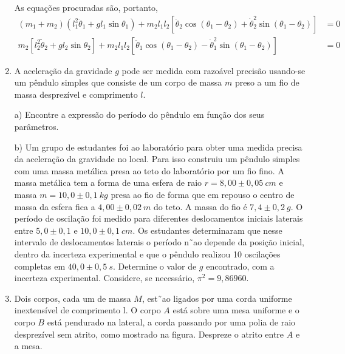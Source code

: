 \begin{enumerate}[start=1,label={\bfseries Q\arabic*.}]
$$$$
As equações procuradas são, portanto,
$$
\begin{aligned}
\left(m_{1}+m_{2}\right)\left(l_{1}^{2} \ddot{\theta}_{1}+g l_{1} \sin \theta_{1}\right)+m_{2} l_{1} l_{2}\left[\ddot{\theta}_{2} \cos \left(\theta_{1}-\theta_{2}\right)+\dot{\theta}_{2}^{2} \sin \left(\theta_{1}-\theta_{2}\right)\right] &=0 \\
m_{2}\left[l_{2}^{2} \tilde{\theta}_{2}+g l_{2} \sin \theta_{2}\right]+m_{2} l_{1} l_{2}\left[\ddot{\theta}_{1} \cos \left(\theta_{1}-\theta_{2}\right)-\dot{\theta}_{1}^{2} \sin \left(\theta_{1}-\theta_{2}\right)\right] &=0
\end{aligned}
$$





\item A aceleração da gravidade $g$ pode ser medida com razoável precisão usando-se um pêndulo simples que consiste de um corpo de massa $m$ preso a um fio de massa desprezível e comprimento $l$.


a) Encontre a expressão do período do pêndulo em função dos seus parâmetros.

\resposta

b) Um grupo de estudantes foi ao laboratório para obter uma medida precisa da aceleração da gravidade no local. Para isso construiu um pêndulo simples com uma massa metálica presa ao teto do laboratório por um fio fino. A massa metálica tem a forma de uma esfera de raio $r = 8,00 \pm 0,05 \ cm$ e massa $m = 10,0 \pm 0,1 \ kg$ presa ao fio de forma que em repouso o centro de massa da esfera fica a $4,00 \pm 0,02 \ m$ do teto. A massa do fio é $7,4 \pm 0,2 \ g$. O período de oscilação foi medido para diferentes deslocamentos iniciais laterais entre $5,0 \pm 0,1$ e $10,0 \pm 0,1 \ cm$. Os estudantes determinaram que nesse intervalo de deslocamentos laterais o período n˜ao depende da posição inicial, dentro da incerteza experimental e que o pêndulo realizou 10 oscilações completas em $40,0 \pm 0,5 \ s$. Determine o valor de $g$ encontrado, com a incerteza experimental. Considere, se necessário, $\pi^{2} = 9,86960$.

\resposta




\item Dois corpos, cada um de massa $M$, est˜ao ligados por uma corda uniforme inextensível de comprimento l. O corpo $A$ está sobre uma mesa uniforme e o corpo $B$ está pendurado na lateral, a corda passando por uma polia de raio desprezível sem atrito, como mostrado na figura. Despreze o atrito entre $A$ e a mesa.


\end{enumerate}
